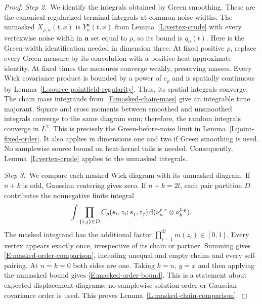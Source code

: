 \begin{proof}
  \medskip
  \noindent\textit{Step 2.~}We identify the integrals obtained by Green
  smoothing.
  These are the canonical regularized terminal integrals at common noise widths.
  The unmasked $X_{\rho,n}(t,x)$ is $Y_n^{\boldsymbol a}(t,x)$ from
  Lemma~\ref{L:vertex-crude} with every vertexwise noise width in $\boldsymbol
  a$ set equal to $\rho$, so its bound is $q_n(t)$.
  Here is the Green-width identification needed in dimension three. At fixed
  positive $\rho$, replace every Green measure by its convolution with a
  positive heat approximate identity. At fixed times the measures converge
  weakly, preserving masses. Every Wick covariance product is bounded by a power
  of $c_\rho$ and is spatially continuous by
  Lemma~\ref{L:source-pointfield-regularity}. Thus, its spatial integrals
  converge. The chain mass integrands from~\eqref{E:masked-chain-mass} give an
  integrable time majorant. Square and cross moments between smoothed and
  unsmoothed integrals converge to the same diagram sum; therefore, the random
  integrals converge in $L^2$. This is precisely the Green-before-noise limit in
  Lemma~\ref{L:joint-fixed-order}. It also applies in dimensions one and two if
  Green smoothing is used. No samplewise source bound on heat-kernel tails is
  needed. Consequently, Lemma~\ref{L:vertex-crude} applies to the unmasked
  integrals.


  \medskip
  \noindent\textit{Step 3.~}We compare each masked Wick diagram with its
  unmasked diagram.
  If $n+k$ is odd, Gaussian centering gives zero. If $n+k = 2l$, each pair
  partition $D$ contributes the nonnegative finite integral
  \[
    \int \prod_{\{i,j\}\in D}
    C_\rho(s_i,z_i;s_j,z_j)
    \,\mathrm{d}(\nu_n^{t,x}\otimes\nu_k^{t,y}).
  \]
  The masked integrand has the additional factor $\prod_{i=1}^{2l}m(z_i) \in
  [0,1]$. Every vertex appears exactly once, irrespective of its chain or
  partner. Summing gives \eqref{E:masked-order-comparison}, including unequal
  and empty chains and every self-pairing. At $n = k = 0$ both sides are one.
  Taking $k = n$, $y = x$ and then applying the unmasked bound gives
  \eqref{E:masked-order-bound}. This is a statement about expected displacement
  diagrams; no samplewise solution order or Gaussian covariance order is used.
  This proves Lemma~\ref{L:masked-chain-comparison}.
\end{proof}

